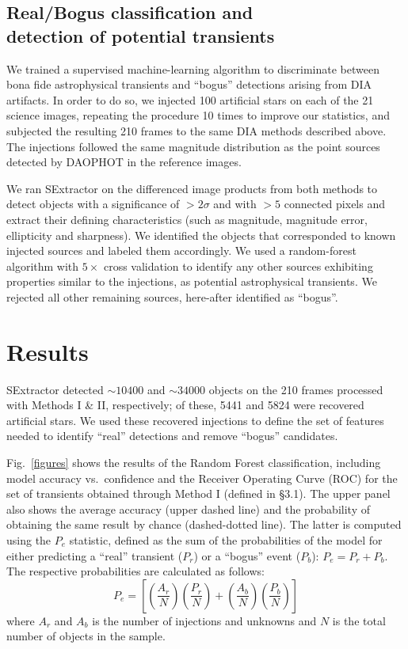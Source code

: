 \documentclass[apjl]{emulateapj}
\begin{document}
\subsection{Real/Bogus classification and\\detection of potential transients} \label{method}

We trained a supervised machine-learning algorithm to discriminate between bona fide astrophysical transients and ``bogus'' detections arising from DIA artifacts.   In order to do so, we injected 100 artificial stars on each of the 21 science images,  repeating the procedure 10 times to improve our statistics, and subjected the resulting 210 frames to the same DIA methods described above.  The injections followed the same magnitude distribution as the point sources detected by DAOPHOT in the reference images.

We ran SExtractor \citep{Bertin1996} on the differenced image products from both methods to detect objects with a significance of $>2\sigma$ and with $>5$ connected pixels and extract their defining characteristics (such as magnitude, magnitude error, ellipticity and sharpness). We identified the objects that corresponded to known injected sources and labeled them accordingly. We used a random-forest algorithm with $5\times$ cross validation to identify any other sources exhibiting properties similar to the injections, as potential astrophysical transients. We rejected all other remaining sources, here-after identified as  ``bogus''.

\section{Results}\label{results}
SExtractor detected $\sim10400$ and $\sim34000$ objects on the 210 frames processed with Methods I \& II, respectively; of these, 5441 and 5824 were recovered artificial stars. We used these recovered injections to define the set of features needed to identify ``real'' detections and remove ``bogus'' candidates. 

Fig.~\ref{figures} shows the results of the Random Forest classification, including model accuracy vs.~confidence and the Receiver Operating Curve (ROC) for the set of transients obtained through Method I (defined in \S3.1). The upper panel also shows the average accuracy (upper dashed line) and the probability of obtaining the same result by chance (dashed-dotted line). The latter is computed using the $P_{e}$ statistic, defined as the sum of the probabilities of the model for either predicting a ``real'' transient ($P_r$) or a ``bogus'' event ($P_b$): $P_e=P_r+P_b$. The respective probabilities are calculated as follows:
\begin{equation}
P_e =\left[ \left( \frac{A_r}{N} \right)  \left( \frac{P_r}{N} \right) + \left( \frac{A_b}{N}\right) \left(\frac{P_b}{N} \right) \right]
\end{equation}
\noindent where $A_r$ and $A_b$ is the number of injections and unknowns and $N$ is the total number of objects in the sample.
\end{document}
